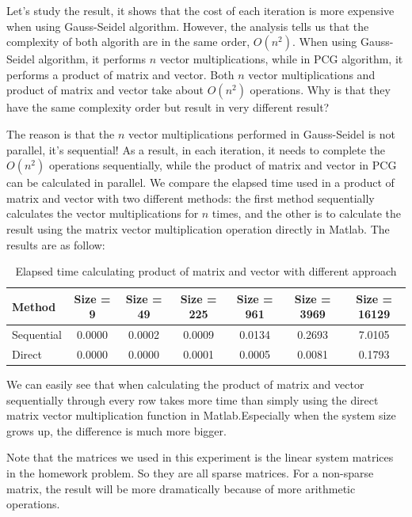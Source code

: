 \documentclass{article}
\begin{document}
Let's study the result, it shows that the cost of each iteration is more expensive when using Gauss-Seidel algorithm. However, the analysis tells us that the complexity of both algorith are in the same order, $O(n^2)$. When using Gauss-Seidel algorithm, it performs $n$ vector multiplications, while in PCG algorithm, it performs a product of matrix and vector. Both $n$ vector multiplications and product of matrix and vector take about $O(n^2)$ operations. Why is that they have the same complexity order but result in very different result?

The reason is that the $n$ vector multiplications performed in Gauss-Seidel is not parallel, it's sequential! As a result, in each iteration, it needs to complete the $O(n^2)$ operations sequentially, while the product of matrix and vector in PCG can be calculated in parallel. We compare the elapsed time used in a product of matrix and vector with two different methods: the first method sequentially calculates the vector multiplications for $n$ times, and the other is to calculate the result using the matrix vector multiplication operation directly in Matlab. The results are as follow:

\begin{table}[h]
\begin{center}
\begin{tabular}{lcccccc}
\hline
Method & Size = 9 & Size = 49 & Size = 225 & Size = 961 & Size = 3969 & Size = 16129\\
\hline
Sequential & 0.0000 & 0.0002 & 0.0009 & 0.0134 & 0.2693 & 7.0105\\
Direct & 0.0000 & 0.0000 & 0.0001 & 0.0005 & 0.0081 & 0.1793\\
\hline
\end{tabular}
\caption{Elapsed time calculating product of matrix and vector with different approach}
\end{center}
\end{table}

We can easily see that when calculating the product of matrix and vector sequentially through every row takes more time than simply using the direct matrix vector multiplication function in Matlab.Especially when the system size grows up, the difference is much more bigger.

Note that the matrices we used in this experiment is the linear system matrices in the homework problem. So they are all sparse matrices. For a non-sparse matrix, the result will be more dramatically because of more arithmetic operations. 
\end{document}
